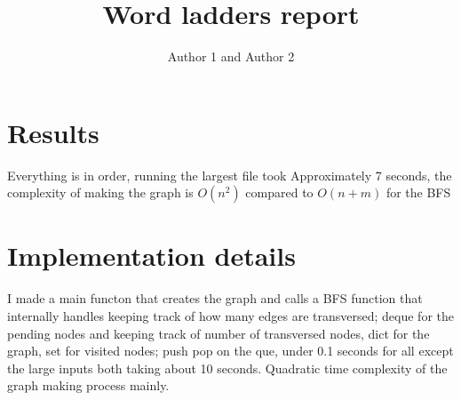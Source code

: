 \documentclass{article}
\title{Word ladders report}
\author{Author 1 and Author 2}
\begin{document}
  \maketitle

  \section{Results}

    Everything is in order, running the largest file took Approximately 7 seconds, the complexity of making the graph is $O(n^2)$ compared to $O(n+m)$ for the BFS
  \section{Implementation details}

    I made a main functon that creates the graph and calls a BFS function that internally handles keeping track of how many edges are transversed; deque for the pending nodes and keeping track of number of transversed nodes, dict for the graph, set for visited nodes; push pop on the que, under 0.1 seconds for all except the large inputs both taking about 10 seconds. Quadratic time complexity of the graph making process mainly.
\end{document}
